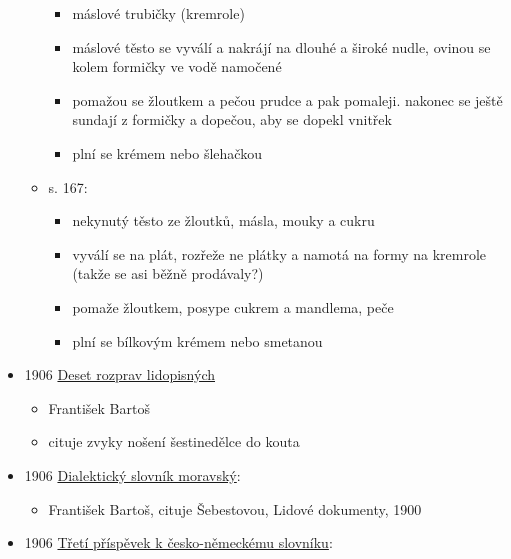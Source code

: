 \begin{itemize}
\begin{itemize}
    \begin{itemize}
    \tightlist
    \item
      máslové trubičky (kremrole)
    \item
      máslové těsto se vyválí a nakrájí na dlouhé a široké nudle, ovinou
      se kolem formičky ve vodě namočené
    \item
      pomažou se žloutkem a pečou prudce a pak pomaleji. nakonec se
      ještě sundají z formičky a dopečou, aby se dopekl vnitřek
    \item
      plní se krémem nebo šlehačkou
    \end{itemize}
  \item
    s. 167:

    \begin{itemize}
    \tightlist
    \item
      nekynutý těsto ze žloutků, másla, mouky a cukru
    \item
      vyválí se na plát, rozřeže ne plátky a namotá na formy na kremrole
      (takže se asi běžně prodávaly?)
    \item
      pomaže žloutkem, posype cukrem a mandlema, peče
    \item
      plní se bílkovým krémem nebo smetanou
    \end{itemize}
  \end{itemize}
\item
  1906
  \href{https://ceskadigitalniknihovna.cz/uuid/uuid:50b3ac32-1b3f-4639-9f61-c01f3883690d}{Deset
  rozprav lidopisných}

  \begin{itemize}
  \tightlist
  \item
    František Bartoš
  \item
    cituje zvyky nošení šestinedělce do kouta
  \end{itemize}
\item
  1906
  \href{https://ceskadigitalniknihovna.cz/view/uuid:d04052b0-a08e-11ed-bf61-5ef3fc9bb22f?page=uuid:50e42324-813b-4538-aaf5-2b1efbf63513&fulltext=trd*ln*k*&source=nkp}{Dialektický
  slovník moravský}:

  \begin{itemize}
  \tightlist
  \item
    František Bartoš, cituje Šebestovou, Lidové dokumenty, 1900
  \end{itemize}
\item
  1906
  \href{https://ndk.cz/uuid/uuid:6a5d3470-e943-11e2-9923-005056827e52}{Třetí
  příspěvek k česko-německému slovníku}:


\end{itemize}
